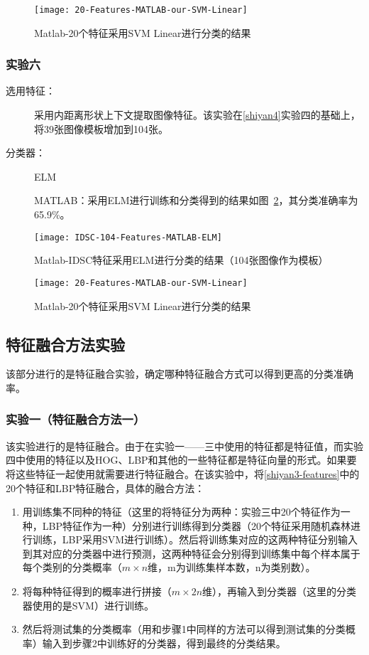 \begin{figure}[!ht]
\centering
\texttt{[image: 20-Features-MATLAB-our-SVM-Linear]}
\caption{Matlab-20个特征采用SVM Linear进行分类的结果}
\label{fig:20-Features-MATLAB-our-SVM-Linear}
\end{figure}

\subsubsection{实验六}
\begin{description}
\item[选用特征：] 采用内距离形状上下文提取图像特征。该实验在\ref{shiyan4}实验四的基础上，将39张图像模板增加到104张。
\item[分类器：] ELM

MATLAB：采用ELM进行训练和分类得到的结果如图~\ref{fig:IDSC-104-Features-MATLAB-ELM}，其分类准确率为65.9\%。
\end{description}
\begin{figure}[!ht]
\centering
\texttt{[image: IDSC-104-Features-MATLAB-ELM]}
\caption{Matlab-IDSC特征采用ELM进行分类的结果（104张图像作为模板）}
\label{fig:IDSC-104-Features-MATLAB-ELM}
\end{figure}

\begin{figure}[!ht]
\centering
\texttt{[image: 20-Features-MATLAB-our-SVM-Linear]}
\caption{Matlab-20个特征采用SVM Linear进行分类的结果}
\label{fig:20-Features-MATLAB-our-SVM-Linear}
\end{figure}


\subsection{特征融合方法实验}
该部分进行的是特征融合实验，确定哪种特征融合方式可以得到更高的分类准确率。

\subsubsection{实验一（特征融合方法一）}
\label{ronghe1}
该实验进行的是特征融合。由于在实验一——三中使用的特征都是特征值，而实验四中使用的特征以及HOG、LBP和其他的一些特征都是特征向量的形式。如果要将这些特征一起使用就需要进行特征融合。在该实验中，将\ref{shiyan3-features}中的20个特征和LBP特征融合，具体的融合方法：
\begin{enumerate}
\item 用训练集不同种的特征（这里的将特征分为两种：实验三中20个特征作为一种，LBP特征作为一种）分别进行训练得到分类器（20个特征采用随机森林进行训练，LBP采用SVM进行训练）。然后将训练集对应的这两种特征分别输入到其对应的分类器中进行预测，这两种特征会分别得到训练集中每个样本属于每个类别的分类概率（$m \times n$维，m为训练集样本数，n为类别数）。
\item 将每种特征得到的概率进行拼接（$m \times 2n$维），再输入到分类器（这里的分类器使用的是SVM）进行训练。
\item 然后将测试集的分类概率（用和步骤1中同样的方法可以得到测试集的分类概率）输入到步骤2中训练好的分类器，得到最终的分类结果。
\end{enumerate}


